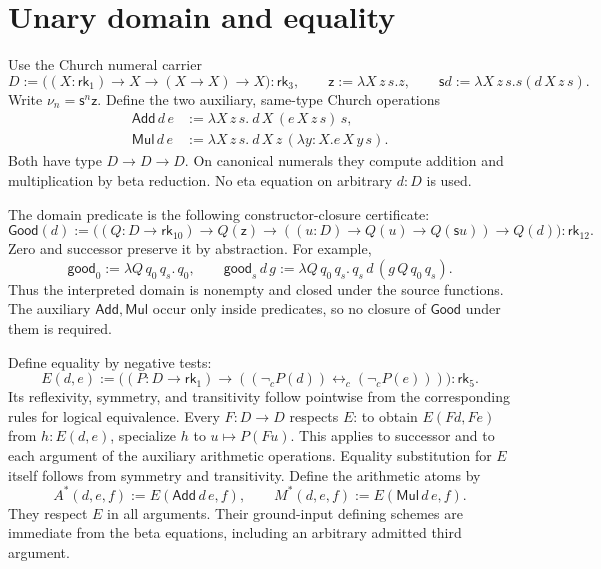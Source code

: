 \documentclass[11pt,a4paper]{article}
\newcommand{\rk}[1]{\mathsf{rk}_{#1}}
\newcommand{\Good}{\mathsf{Good}}
\newcommand{\Add}{\mathsf{Add}}
\newcommand{\Mul}{\mathsf{Mul}}
\newcommand{\z}{\mathsf z}
\newcommand{\suc}{\mathsf s}
\newcommand{\nc}{\mathop{\neg}\nolimits_c}
\newcommand{\iffc}{\mathbin{\leftrightarrow_c}}
\theoremstyle{remark}\newtheorem*{remark}{Remark}
\begin{document}
\section{Unary domain and equality}\label{sec:unary}
Use the Church numeral carrier
\[
 D:=\bigl((X:\rk1)\to X\to(X\to X)\to X\bigr):\rk3,
 \qquad
 \z:=\lambda X\,z\,s.z,\qquad
 \suc d:=\lambda X\,z\,s.s(d\,X\,z\,s).
\]
Write $\nu_n=\suc^n\z$. Define the two auxiliary, same-type Church operations
\begin{align*}
 \Add\,d\,e&:=\lambda X\,z\,s.\ d\,X\,(e\,X\,z\,s)\,s,\\
 \Mul\,d\,e&:=\lambda X\,z\,s.\ d\,X\,z\,(\lambda y:X.e\,X\,y\,s).
\end{align*}
Both have type $D\to D\to D$. On canonical numerals they compute addition
and multiplication by beta reduction. No eta equation on arbitrary $d:D$
is used.

The domain predicate is the following constructor-closure certificate:
\[
 \Good(d):=\bigl((Q:D\to\rk{10})\to Q(\z)
 \to((u:D)\to Q(u)\to Q(\suc u))\to Q(d)\bigr):\rk{12}.
\]
Zero and successor preserve it by abstraction. For example,
\[
 \mathsf{good}_0:=\lambda Q\,q_0\,q_s.\,q_0,\qquad
 \mathsf{good}_s\,d\,g:=\lambda Q\,q_0\,q_s.\,
 q_s\,d\,(g\,Q\,q_0\,q_s).
\]
Thus the interpreted domain is nonempty and closed under the source
functions. The auxiliary $\Add,\Mul$ occur only inside predicates, so no
closure of $\Good$ under them is required.

Define equality by negative tests:
\[
 \boxed{E(d,e):=\bigl((P:D\to\rk1)\to
       ((\nc P(d))\iffc(\nc P(e)))\bigr):\rk5.}
\]
Its reflexivity, symmetry, and transitivity follow pointwise from the
corresponding rules for logical equivalence. Every $F:D\to D$ respects $E$:
to obtain $E(Fd,Fe)$ from $h:E(d,e)$, specialize $h$ to
$u\mapsto P(Fu)$. This applies to successor and to each argument of the
auxiliary arithmetic operations. Equality substitution for $E$ itself follows
from symmetry and transitivity. Define the arithmetic atoms by
\[
 A^*(d,e,f):=E(\Add\,d\,e,f),\qquad
 M^*(d,e,f):=E(\Mul\,d\,e,f).
\]
They respect $E$ in all arguments. Their ground-input defining schemes are
immediate from the beta equations, including an arbitrary admitted third
argument.
\end{document}
